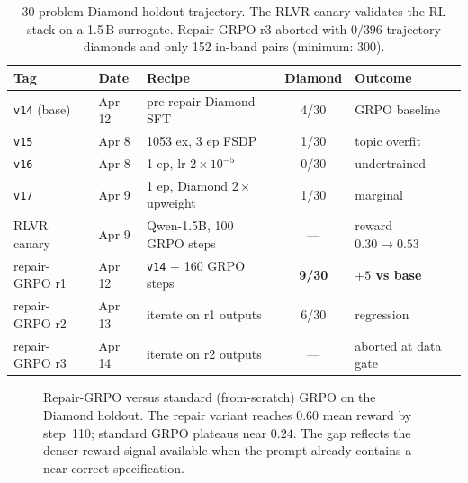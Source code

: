 \documentclass[11pt]{article}
\begin{document}
\begin{table}[h]
\centering
\small
\setlength{\tabcolsep}{4pt}
\begin{tabular}{@{}lllcl@{}}
\toprule
Tag & Date & Recipe & Diamond & Outcome \\
\midrule
\texttt{v14} (base) & Apr 12 & pre-repair Diamond-SFT
  & 4/30 & GRPO baseline \\
\texttt{v15} & Apr 8 & 1053 ex, 3 ep FSDP
  & 1/30 & topic overfit \\
\texttt{v16} & Apr 8 & 1 ep, lr $2{\times}10^{-5}$
  & 0/30 & undertrained \\
\texttt{v17} & Apr 9 & 1 ep, Diamond $2\times$ upweight
  & 1/30 & marginal \\
\midrule
RLVR canary & Apr 9 & Qwen-1.5B, 100 GRPO steps
  & --- & reward $0.30{\to}0.53$ \\
repair-GRPO r1 & Apr 12 & \texttt{v14} $+$ 160 GRPO steps
  & \textbf{9/30} & \textbf{$+5$ vs base} \\
repair-GRPO r2 & Apr 13 & iterate on r1 outputs
  & 6/30 & regression \\
repair-GRPO r3 & Apr 14 & iterate on r2 outputs
  & --- & aborted at data gate \\
\bottomrule
\end{tabular}
\caption{30-problem Diamond holdout trajectory.  The RLVR canary
validates the RL stack on a 1.5\,B surrogate.  Repair-GRPO r3 aborted
with $0/396$ trajectory diamonds and only 152 in-band pairs (minimum:
300).}
\label{tab:diamond-history}
\end{table}

\begin{figure}[h]
\centering
{}
\caption{Repair-GRPO versus standard (from-scratch) GRPO on the
Diamond holdout.  The repair variant reaches $0.60$ mean reward by
step~110; standard GRPO plateaus near $0.24$.  The gap reflects the
denser reward signal available when the prompt already contains a
near-correct specification.}
\label{fig:grpo-curve}
\end{figure}
\end{document}
